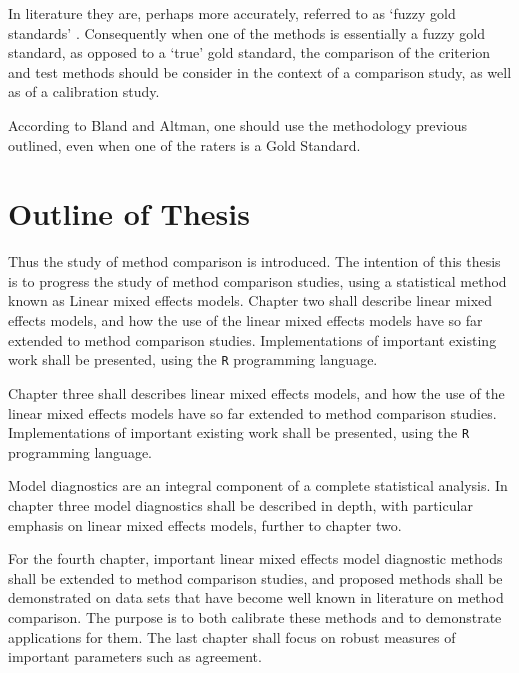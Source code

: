 \documentclass[12pt, a4paper]{report}
\theoremstyle{plain}
\theoremstyle{definition}
\theoremstyle{remark}
\begin{document}
	In literature they are, perhaps more accurately, referred to as
	`fuzzy gold standards' \citep{phelps}. Consequently when one of the methods is
	essentially a fuzzy gold standard, as opposed to a `true' gold
	standard, the comparison of the criterion and test methods should
	be consider in the context of a comparison study, as well as of a
	calibration study.
	
	
	
	
	According to Bland and Altman, one should use the methodology
	previous outlined, even when one of the raters is a Gold Standard.
	
	
	
	
	
	
	
	
	\section{Outline of Thesis}
	Thus the study of method comparison is introduced. The intention of this thesis is to progress the
	study of method comparison studies, using a statistical method known as Linear mixed effects models.
	Chapter two shall describe linear mixed effects models, and how the use of the linear mixed
	effects models have so far extended to method comparison studies. Implementations of important existing work shall be presented, using the \texttt{R} programming language.
	
	
	
	Chapter three shall describes linear mixed effects models, and how the use of the linear mixed effects models have so far extended to method comparison studies. Implementations of important existing work shall be presented, using the \texttt{R} programming language.
	
	Model diagnostics are an integral component of a complete statistical analysis.
	In chapter three model diagnostics shall be described in depth, with particular
	emphasis on linear mixed effects models, further to chapter two.
	
	For the fourth chapter, important linear mixed effects model diagnostic methods shall be extended to method comparison studies, and proposed methods shall be demonstrated on data sets that have become well known in literature on method comparison. The purpose is to both calibrate these methods and to demonstrate applications for them.
	The last chapter shall focus on robust measures of important parameters such as agreement.
	
	
	
\end{document}
